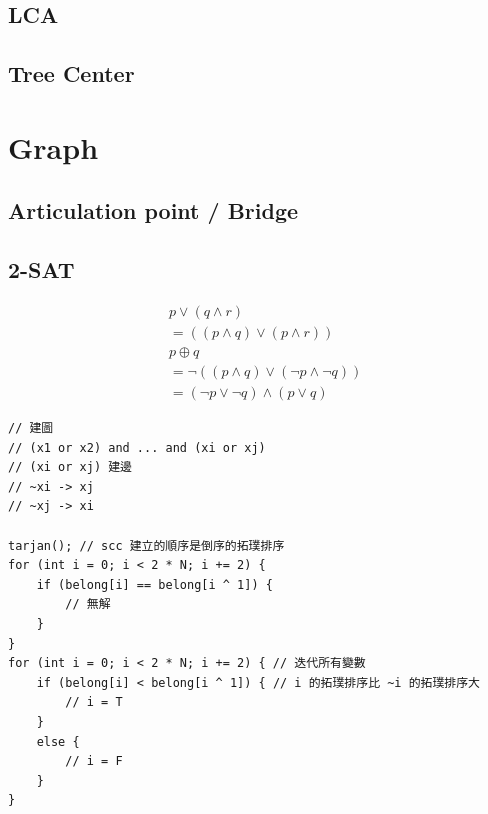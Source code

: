 \documentclass[10pt,oneside]{article}
\begin{document}
\begin{landscape}
\begin{multicols}{2}
\subsection{LCA}

\subsection{Tree Center}



\section{Graph}

\subsection{Articulation point / Bridge}

\subsection{2-SAT}

{\normalsize 
\begin{align*}
&p \lor (q \land r)  \\
&= ((p \land q) \lor (p \land r)) \\
&p \oplus q   \\
&= \lnot ( (p \land q) \lor (\lnot p \land \lnot q))     \\
&= (\lnot p \lor \lnot q) \land (p \lor q)    
\end{align*}
}

\begin{verbatim}
// 建圖
// (x1 or x2) and ... and (xi or xj)
// (xi or xj) 建邊
// ~xi -> xj
// ~xj -> xi

tarjan(); // scc 建立的順序是倒序的拓璞排序
for (int i = 0; i < 2 * N; i += 2) {
    if (belong[i] == belong[i ^ 1]) {
        // 無解
    }
}
for (int i = 0; i < 2 * N; i += 2) { // 迭代所有變數
    if (belong[i] < belong[i ^ 1]) { // i 的拓璞排序比 ~i 的拓璞排序大
        // i = T
    }
    else {
        // i = F
    }
}
\end{verbatim}


\end{multicols}
\end{landscape}
\end{document}
